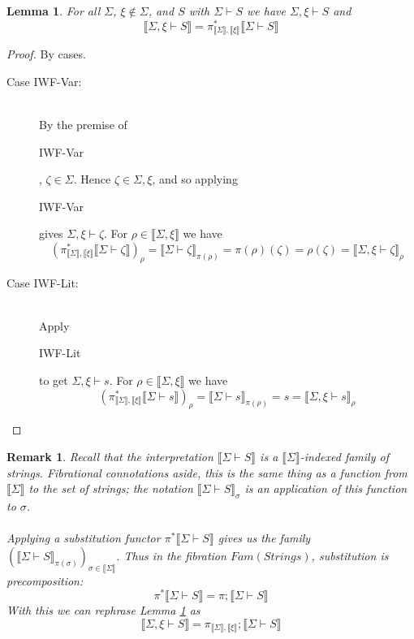 \documentclass{article}
\newtheorem{lemma}{Lemma}
\newcommand{\sem}[1]{\llbracket #1 \rrbracket}
\newtheorem{remark}{Remark}
\begin{document}
\begin{lemma}
For all $\Sigma$, $\xi \not \in \Sigma$, and $S$ with $\Sigma \vdash S$ we have $\Sigma,\xi \vdash S$ and $$\sem{\Sigma,\xi \vdash S} = \pi_{\sem{\Sigma}, \sem{\xi}}^*\sem{\Sigma \vdash S}$$
\label{lemma:weakiwf}
\end{lemma}
\begin{proof}
By cases.
\begin{description}
\item[Case IWF-Var:]~\\
By the premise of \begin{sc}IWF-Var\end{sc}, $\zeta \in \Sigma$. Hence $\zeta \in \Sigma,\xi$, and so applying \begin{sc}IWF-Var\end{sc} gives $\Sigma,\xi \vdash \zeta$. For $\rho \in \sem{\Sigma,\xi}$ we have
$$(\pi_{\sem{\Sigma}, \sem{\xi}}^*\sem{\Sigma \vdash \zeta})_\rho = \sem{\Sigma \vdash \zeta}_{\pi(\rho)} = \pi(\rho)(\zeta) = \rho(\zeta) = \sem{\Sigma,\xi \vdash \zeta}_{\rho}$$

\item[Case IWF-Lit:]~\\

Apply \begin{sc}IWF-Lit\end{sc} to get $\Sigma,\xi \vdash s$. For $\rho \in \sem{\Sigma,\xi}$ we have $$(\pi_{\sem{\Sigma},\sem{\xi}}^* \sem{\Sigma \vdash s})_\rho = \sem{\Sigma \vdash s}_{\pi(\rho)} = s = \sem{\Sigma,\xi \vdash s}_\rho$$

\end{description}
\end{proof}

\begin{remark}
Recall that the interpretation $\sem{\Sigma \vdash S}$ is a $\sem{\Sigma}$-indexed family of strings. Fibrational connotations aside, this is the same thing as a function from $\sem{\Sigma}$ to the set of strings; the notation $\sem{\Sigma \vdash S}_\sigma$ is an application of this function to $\sigma$.\\~\\
Applying a substitution functor $\pi^* \sem{\Sigma \vdash S}$ gives us the family $(\sem{\Sigma \vdash S}_{\pi(\sigma)})_{\sigma \in \sem{\Sigma}}$. Thus in the fibration $\mathit{Fam}(\mathit{Strings})$, substitution is precomposition: $$\pi^* \sem{\Sigma \vdash S} = \pi;\sem{\Sigma \vdash S}$$ With this we can rephrase Lemma \ref{lemma:weakiwf} as $$\sem{\Sigma,\xi \vdash S} = \pi_{\sem{\Sigma},\sem{\xi}};\sem{\Sigma \vdash S}$$  
\end{remark}
\end{document}
